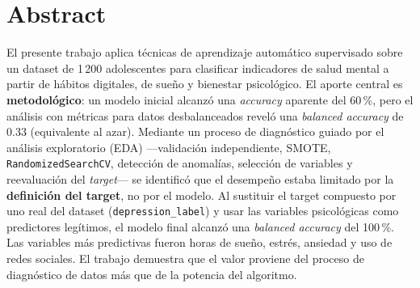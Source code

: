 \documentclass[11pt,twocolumn]{article}
\begin{document}

\section*{Abstract}

El presente trabajo aplica t\'ecnicas de aprendizaje autom\'atico supervisado
sobre un dataset de 1\,200 adolescentes para clasificar indicadores de salud
mental a partir de h\'abitos digitales, de sue\~no y bienestar psicol\'ogico.
El aporte central es \textbf{metodol\'ogico}: un modelo inicial alcanz\'o una
\textit{accuracy} aparente del 60\,\%, pero el an\'alisis con m\'etricas para
datos desbalanceados revel\'o una \textit{balanced accuracy} de 0.33
(equivalente al azar). Mediante un proceso de diagn\'ostico guiado por el
an\'alisis exploratorio (EDA) ---validaci\'on independiente, SMOTE,
\texttt{RandomizedSearchCV}, detecci\'on de anomal\'ias, selecci\'on de
variables y reevaluaci\'on del \textit{target}--- se identific\'o que el
desempe\~no estaba limitado por la \textbf{definici\'on del target}, no por el
modelo. Al sustituir el target compuesto por uno real del dataset
(\texttt{depression\_label}) y usar las variables psicol\'ogicas como
predictores leg\'itimos, el modelo final alcanz\'o una \textit{balanced
accuracy} del 100\,\%. Las variables m\'as predictivas fueron horas de sue\~no,
estr\'es, ansiedad y uso de redes sociales. El trabajo demuestra que el valor
proviene del proceso de diagn\'ostico de datos m\'as que de la potencia del
algoritmo.
\end{document}
